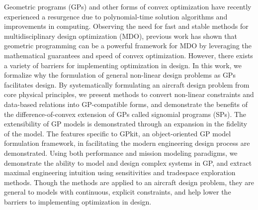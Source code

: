 % 
% 
%


Geometric programs (GPs) and other forms of convex optimization have recently experienced
a resurgence due to polynomial-time solution algorithms and improvements in computing.
Observing the need for fast and stable methods for multidisciplinary
design optimization (MDO),
previous work has shown that geometric programming can be a powerful framework
for MDO by leveraging the mathematical guarantees
and speed of convex optimization. However, there exists a variety of barriers for
implementing optimization in design. In this work, we formalize why the formulation
of general non-linear design problems as GPs facilitates design. By systematically
formulating an aircraft design problem from core physical principles, we present methods
to convert non-linear constraints and data-based relations into GP-compatible forms,
and demonstrate the benefits of the difference-of-convex extension of
GPs called signomial programs (SPs).
The extensibility of GP models is demonstrated through an expansion
in the fidelity of the model.
The features specific to GPkit, an object-oriented GP model formulation framework, in
facilitating the modern engineering design process are demonstrated.
Using both performance and mission modeling paradigms, we demonstrate the ability to
model and design complex systems in GP, and extract maximal engineering intuition
using sensitivities and tradespace exploration methods.
Though the methods are applied to an aircraft design problem, they are general to
models with continuous, explicit constraints, and help lower the barriers to implementing
optimization in design.

